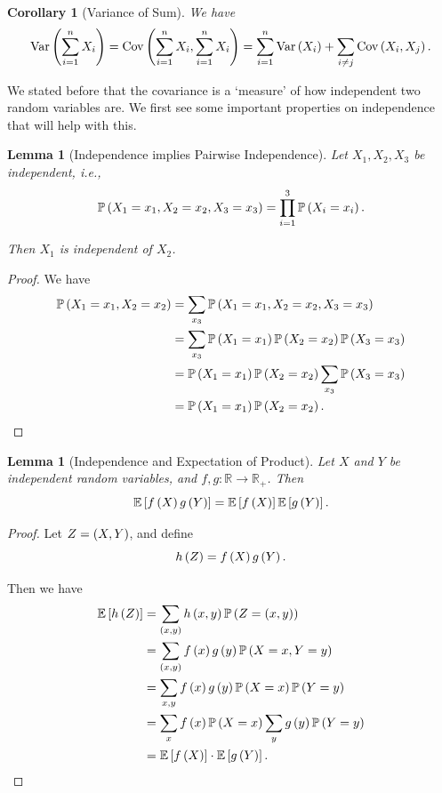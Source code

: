 \documentclass{article}
\newtheorem{lemma}[theorem]{Lemma}
\newtheorem{corollary}[theorem]{Corollary}
\theoremstyle{definition}
\theoremstyle{remark}
\newcommand{\RR}{\mathbb{R}}
\newcommand{\Prob}{\mathbb{P}}
\newcommand{\Expt}{\mathbb{E}}
\newcommand{\functiondomain}[3]{#1:#2\to #3}
\newcommand{\Var}{\operatorname{Var}}
\newcommand{\Cov}{\operatorname{Cov}}
\begin{document}
\begin{corollary}[Variance of Sum]
    \label{cor:variance-of-sum}%
    We have
    \[
        \Var\pqty{\sum_{i = 1}^{n} X_i} = \Cov\pqty{\sum_{i = 1}^{n} X_i, \sum_{i = 1}^{n} X_i} = \sum_{i = 1}^{n} \Var\pqty{X_i} + \sum_{i \neq j} \Cov\pqty{X_i, X_j}.
    \]
\end{corollary}

We stated before that the covariance is a `measure' of how independent two random variables are. We first see some important properties on independence that will help with this.

\begin{lemma}[Independence implies Pairwise Independence]
    \label{lem:indep-pairwise-indep}%
    Let \(X_1, X_2, X_3\) be independent, i.e.,
    \[
        \Prob\pqty{X_1 = x_1, X_2 = x_2, X_3 = x_3} = \prod_{i = 1}^{3} \Prob\pqty{X_i = x_i}.
    \]

    Then \(X_1\) is independent of \(X_2\).
\end{lemma}

\begin{proof}
    We have
    \begin{align*}
        \Prob\pqty{X_1 = x_1, X_2 = x_2} &= \sum_{x_3} \Prob\pqty{X_1 = x_1, X_2 = x_2, X_3 = x_3} \\
        &= \sum_{x_3} \Prob\pqty{X_1 = x_1} \Prob\pqty{X_2 = x_2} \Prob\pqty{X_3 = x_3} \\
        &= \Prob\pqty{X_1 = x_1} \Prob\pqty{X_2 = x_2} \sum_{x_3} \Prob\pqty{X_3 = x_3} \\
        &= \Prob\pqty{X_1 = x_1} \Prob\pqty{X_2 = x_2}.
    \end{align*}
\end{proof}

\begin{lemma}[Independence and Expectation of Product]
    \label{lem:independence-expectation-product}%
    Let \(X\) and \(Y\) be independent random variables, and \(\functiondomain{f, g}{\RR}{\RR_{+}}\). Then
    \[
        \Expt\bqty{f\pqty{X} g\pqty{Y}} = \Expt\bqty{f\pqty{X}} \Expt\bqty{g\pqty{Y}}.
    \]
\end{lemma}

\begin{proof}
    Let \(Z = \left(X, Y\right)\), and define
    \[  
        h\left(Z\right) = f\left(X\right) g\left(Y\right).
    \]

    Then we have
    \begin{align*}
        \Expt\bqty{h\pqty{Z}} &= \sum_{\pqty{x, y}} h\pqty{x, y} \Prob\pqty{Z = \pqty{x, y}} \\
        &= \sum_{\pqty{x, y}} f\pqty{x} g\pqty{y} \Prob\pqty{X = x, Y = y} \\
        &= \sum_{x, y} f\pqty{x} g\pqty{y} \Prob\pqty{X = x} \Prob\pqty{Y = y} \\
        &= \sum_{x} f\pqty{x} \Prob\pqty{X = x} \sum_{y} g\pqty{y} \Prob\pqty{Y = y} \\
        &= \Expt\bqty{f\pqty{X}} \cdot \Expt\bqty{g\pqty{Y}}.
    \end{align*}
\end{proof}
\end{document}

